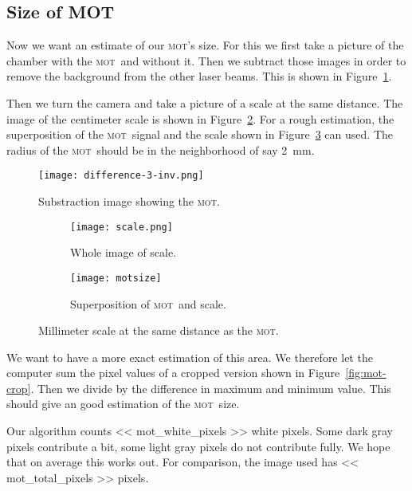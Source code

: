 \documentclass[11pt, english, fleqn, DIV=15, headinclude, BCOR=2cm]{scrreprt}
\newcommand\mot{\textsc{mot}}
\begin{document}
\subsection{Size of MOT}

Now we want an estimate of our \mot's size. For this we first take a picture of
the chamber with the \mot\ and without it. Then we subtract those images in
order to remove the background from the other laser beams. This is shown in
Figure~\ref{fig:difference-3-inv}.

Then we turn the camera and take a picture of a scale at the same distance. The
image of the centimeter scale is shown in Figure~\ref{fig:scale}. For a rough
estimation, the superposition of the \mot\ signal and the scale shown in
Figure~\ref{fig:motsize} can used. The radius of the \mot\ should be in the
neighborhood of say \SI{2}{\milli\meter}.

\begin{figure}
    \centering
    \texttt{[image: difference-3-inv.png]}
    \caption{Substraction image showing the \mot.}
    \label{fig:difference-3-inv}
\end{figure}

\begin{figure}
    \begin{subfigure}{.45\textwidth}
        \centering
        \texttt{[image: scale.png]}
        \caption{Whole image of scale.}
        \label{fig:scale}
    \end{subfigure}
    \hfill
    \begin{subfigure}{.45\textwidth}
        \centering
        \texttt{[image: motsize]}
        \caption{Superposition of \mot\ and scale.}
        \label{fig:motsize}
    \end{subfigure}
    \caption{Millimeter scale at the same distance as the \mot.}
    \label{fig:mot_size}
\end{figure}

We want to have a more exact estimation of this area. We therefore let the
computer sum the pixel values of a cropped version shown in
Figure~\ref{fig:mot-crop}. Then we divide by the difference in maximum and
minimum value. This should give an good estimation of the \mot\ size.

Our algorithm counts \num{<< mot_white_pixels >>} white pixels. Some dark gray
pixels contribute a bit, some light gray pixels do not contribute fully. We
hope that on average this works out. For comparison, the image used has \num{<<
mot_total_pixels >>} pixels.
\end{document}
